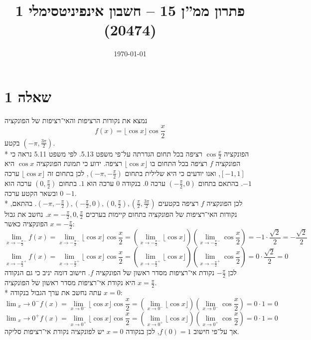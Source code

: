 \documentclass[a4paper]{article}
\title{פתרון ממ''ן 15 – חשבון אינפיניטסימלי 1 (20474)}
\author{\AUTHOR}
\date\today
\begin{document}
\maketitle
\section{שאלה 1}
נמצא את נקודות הרציפות והאי־רציפות של הפונקציה
\[
	f(x) = \lfloor \cos x \rfloor \cos \frac{x}{2}
\]
בקטע $(-\pi, \frac{3 \pi}{2})$. \\*
הפונקציה $\cos \frac{x}{2}$ רציפה בכל תחום הגדרתה על־פי משפט 5.13.
לפי משפט 5.11 נראה כי הפונקציה $f$ רציפה בכל התחום בו $\lfloor \cos x \rfloor$ רציפה.
ידוע כי תמונת הפונקציה $\cos x$ היא $[-1, 1]$, ואנו יודעים כי היא שלילית בתחום $(-\pi, -\frac{\pi}{2})$,
לכן בתחום זה $\lfloor \cos x \rfloor$ ערכה $-1$.
בהתאם בתחום $(-\frac{\pi}{2}, 0)$ ערכה $0$.
בנקודה $0$ ערכה הוא $1$.
בתחום $(0, \frac{\pi}{2})$ ערכה הוא $0$ ובשאר הקטע ערכה $-1$. \\*
לכן הפונקציה $f$ רציפה בקטעים $(-\pi, -\frac{\pi}{2}), (-\frac{\pi}{2}, 0), (0, \frac{\pi}{2}), (\frac{\pi}{2}, \frac{3\pi}{2})$.
בהתאם, נקודות האי־רציפות של הפונקציה בתחום קיימות בערכים $x = -\frac{\pi}{2}, 0, \frac{\pi}{2}$.
נחשב את גבול הפונקציה כאשר $x = -\frac{\pi}{2}$:
\[
	\lim_{x \to -\frac{\pi}{2}^-} f(x)
	= \lim_{x \to -\frac{\pi}{2}^-} \lfloor \cos x \rfloor \cos \frac{x}{2}
	= \left( \lim_{x \to -\frac{\pi}{2}^-} \lfloor \cos x \rfloor \right) \left( \lim_{x \to -\frac{\pi}{2}^-} \cos \frac{x}{2} \right)
	= -1 \cdot \frac{\sqrt{2}}{2}
	= -\frac{\sqrt{2}}{2}
\]
\[
	\lim_{x \to -\frac{\pi}{2}^+} f(x)
	= \lim_{x \to -\frac{\pi}{2}^+} \lfloor \cos x \rfloor \cos \frac{x}{2}
	= \left( \lim_{x \to -\frac{\pi}{2}^+} \lfloor \cos x \rfloor \right) \left( \lim_{x \to -\frac{\pi}{2}^+} \cos \frac{x}{2} \right)
	= 0 \cdot \frac{\sqrt{2}}{2}
	= 0
\]
לכן $-\frac{\pi}{2}$ נקודת אי־רציפות מסדר ראשון של הפונקציה $f$.
חישוב דומה יניב כי גם הנקודה $x = \frac{\pi}{2}$ היא נקודת אי־רציפות מסדר ראשון של הפונקציה. \\*
עתה נחשב את ערך הגבול בנקודה $x = 0$:
\[
	\lim{_x \to 0^-} f(x)
	= \lim_{x \to 0^-} \lfloor \cos x \rfloor \cos \frac{x}{2}
	= \left( \lim_{x \to 0^-} \lfloor \cos x \rfloor \right) \left( \lim_{x \to 0^-} \cos \frac{x}{2} \right)
	= 0 \cdot 1
	= 0
\]
\[
	\lim{_x \to 0^+} f(x)
	= \lim_{x \to 0^+} \lfloor \cos x \rfloor \cos \frac{x}{2}
	= \left( \lim_{x \to 0^+} \lfloor \cos x \rfloor \right) \left( \lim_{x \to 0^+} \cos \frac{x}{2} \right)
	= 0 \cdot 1
	= 0
\]
אך על־פי חישוב $f(0) = 1$, לכן בנקודה $x = 0$ יש לפונקציה נקודת אי־רציפות סליקה.
\end{document}
